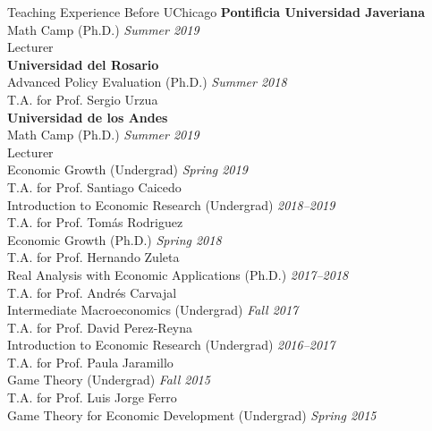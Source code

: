 \documentclass{resume} %
\begin{document}
	\begin{rSection}{Teaching Experience Before UChicago}
		\textbf{Pontificia Universidad Javeriana}\\
		Math Camp (Ph.D.) \hfill {\em Summer 2019}\\[-0.25em]
		{\small Lecturer}\\[0.35em]
		\textbf{Universidad del Rosario}\\
		Advanced Policy Evaluation (Ph.D.) \hfill {\em Summer 2018}\\[-0.25em]
		{\small T.A. for Prof. Sergio Urzua}\\[0.35em]
		\textbf{Universidad de los Andes}\\
		Math Camp (Ph.D.) \hfill {\em Summer 2019}\\[-0.25em]
		{\small Lecturer}\\[0.35em]
		Economic Growth (Undergrad) \hfill {\em Spring 2019}\\[-0.25em]
		{\small T.A. for Prof. Santiago Caicedo}\\[0.35em]
		Introduction to Economic Research (Undergrad) \hfill {\em 2018--2019}\\[-0.25em]
		{\small T.A. for Prof. Tomás Rodriguez}\\[0.35em]
		Economic Growth (Ph.D.) \hfill {\em Spring 2018}\\[-0.25em]
		{\small T.A. for Prof. Hernando Zuleta}\\[0.35em]
		Real Analysis with Economic Applications (Ph.D.) \hfill {\em 2017--2018}\\[-0.25em]
		{\small T.A. for Prof. Andrés Carvajal}\\[0.35em]
		Intermediate Macroeconomics (Undergrad) \hfill {\em Fall 2017}\\[-0.25em]
		{\small T.A. for Prof. David Perez-Reyna}\\[0.35em]
		Introduction to Economic Research (Undergrad) \hfill {\em 2016--2017}\\[-0.25em]
		{\small T.A. for Prof. Paula Jaramillo}\\[0.35em]
		Game Theory (Undergrad) \hfill {\em Fall 2015}\\[-0.25em]
		{\small T.A. for Prof. Luis Jorge Ferro}\\[0.35em]
		Game Theory for Economic Development (Undergrad) \hfill {\em Spring 2015}\\[-0.25em]

\end{rSection}
\end{document}
